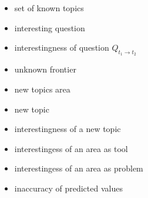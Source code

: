 \begin{itemize}[leftmargin=1.5cm]
\item [$T'$] set of known topics
\item [$Q_{t_{1} \rightarrow t_{2}}$] interesting question
\item [$IQ_{t_{1} \rightarrow t_{2}}$] interestingness of question $Q_{t_{1} \rightarrow t_{2}}$

\item [$\mathbb{F}$] unknown frontier
\item [$\mathbb{S}$] new topics area
\item [$S_{\left\{ t_{1},t_{2}\right\} }$] new topic
\item [$IS_{\left\{ t_{1},t_{2}\right\} }$] interestingness of a new topic

\item [$IT_{A}$] interestingess of an area as tool
\item [$IP_{A}$] interestingess of an area as problem

%
%

\bigskip

\item [$\hat\iota(\mathbf{\hat{y}}, \mathbf{y})$] inaccuracy of predicted values

\end{itemize}


